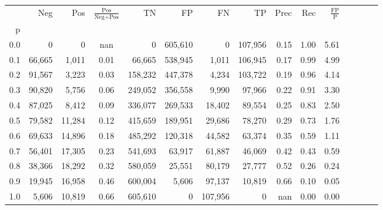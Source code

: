 \begin{tabular}{rrrcrrrrrrrrrrr}
\toprule
{} &     Neg &     Pos & $\frac{\text{Pos}}{\text{Neg}+\text{Pos}}$ &       TN &       FP &       FN &       TP &  Prec &   Rec & $\frac{\text{FP}}{\text{P}}$ \\
p   &         &         &                                            &          &          &          &          &       &       &                              \\
\midrule
0.0 &       0 &       0 &                                        nan &        0 &  605,610 &        0 &  107,956 &  0.15 &  1.00 &                         5.61 \\
0.1 &  66,665 &   1,011 &                                       0.01 &   66,665 &  538,945 &    1,011 &  106,945 &  0.17 &  0.99 &                         4.99 \\
0.2 &  91,567 &   3,223 &                                       0.03 &  158,232 &  447,378 &    4,234 &  103,722 &  0.19 &  0.96 &                         4.14 \\
0.3 &  90,820 &   5,756 &                                       0.06 &  249,052 &  356,558 &    9,990 &   97,966 &  0.22 &  0.91 &                         3.30 \\
0.4 &  87,025 &   8,412 &                                       0.09 &  336,077 &  269,533 &   18,402 &   89,554 &  0.25 &  0.83 &                         2.50 \\
0.5 &  79,582 &  11,284 &                                       0.12 &  415,659 &  189,951 &   29,686 &   78,270 &  0.29 &  0.73 &                         1.76 \\
0.6 &  69,633 &  14,896 &                                       0.18 &  485,292 &  120,318 &   44,582 &   63,374 &  0.35 &  0.59 &                         1.11 \\
0.7 &  56,401 &  17,305 &                                       0.23 &  541,693 &   63,917 &   61,887 &   46,069 &  0.42 &  0.43 &                         0.59 \\
0.8 &  38,366 &  18,292 &                                       0.32 &  580,059 &   25,551 &   80,179 &   27,777 &  0.52 &  0.26 &                         0.24 \\
0.9 &  19,945 &  16,958 &                                       0.46 &  600,004 &    5,606 &   97,137 &   10,819 &  0.66 &  0.10 &                         0.05 \\
1.0 &   5,606 &  10,819 &                                       0.66 &  605,610 &        0 &  107,956 &        0 &   nan &  0.00 &                         0.00 \\
\bottomrule
\end{tabular}
